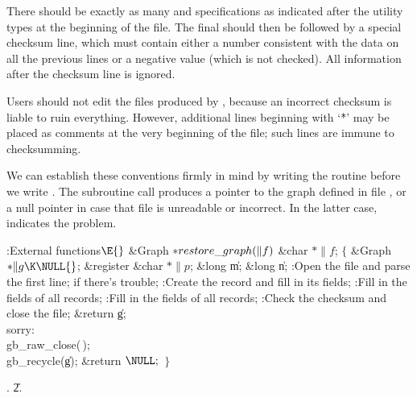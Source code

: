 There should be exactly as many  and  specifications
as
indicated after the utility types at the beginning of the file.  The
final  should then be followed by a special checksum line, which
must contain either a number consistent with the data on all the previous
lines or a negative value (which is not checked).
All information after the checksum line is ignored.

Users should not edit the files produced by , because an
incorrect checksum is liable to ruin everything. However, additional
lines beginning with `\.*' may be placed as comments at the very
beginning of the file; such lines are immune to checksumming.

\fi

We can establish these conventions firmly in mind by writing the
 routine before we write . The
subroutine
call  produces a pointer to the graph
defined in file , or a null pointer in case that file
is unreadable or incorrect. In the latter case, 
indicates the problem.

\Y\B\4:External functions\X${}\E{}$\6
\1\1\&{Graph} ${}{*}\\{restore\_graph}(\|f){}$\6
\&{char} ${}{*}\|f{}$;\2\2\6
${}\{{}$\5
\1\&{Graph} ${}{*}\|g\K\NULL{}$;\6
\&{register} \&{char} ${}{*}\|p{}$;\6
\&{long} \|m;\6
\&{long} \|n;\7
:Open the file and parse the first line;  if there's
trouble\X;\6
:Create the  record  and fill in its fields\X;\6
:Fill in the fields of all  records\X;\6
:Fill in the fields of all  records\X;\6
:Check the checksum and close the file\X;\6
\&{return} \|g;\6
\4\\{sorry}:\5
\\{gb\_raw\_close}(\,);\5
\\{gb\_recycle}(\|g);\5
\&{return} ${}\NULL;{}$\6
\4${}\}{}$\2\par
{}.
\U2.\fi

